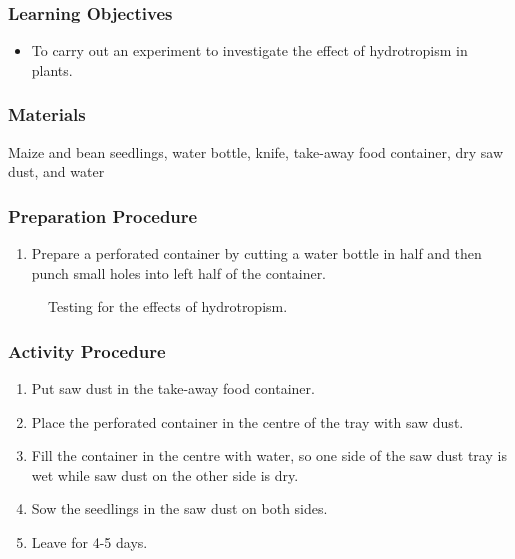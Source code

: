 \subsubsection*{Learning Objectives}
\begin{itemize}
\item{To carry out an experiment to investigate the effect of hydrotropism in plants.}
\end{itemize}

\subsubsection*{Materials}
Maize and bean seedlings, water bottle, knife, take-away food container, dry saw dust, and water

\subsubsection*{Preparation Procedure}
\begin{enumerate}
\item{Prepare a perforated container by cutting a water bottle in half and then punch small holes into left half of the container.}
\end{enumerate}

\begin{figure}[h]
\begin{center}
\def\svgwidth{12cm}

\caption{Testing for the effects of hydrotropism.}
\label{fig:hydro}
\end{center}
\end{figure}

\subsubsection*{Activity Procedure}
\begin{enumerate}
\item{Put saw dust in the take-away food container.}
\item{Place the perforated container in the centre of the tray with saw dust.}
\item{Fill the container in the centre with water, so one side of the saw dust tray is wet while saw dust on the other side is dry.}
\item{Sow the seedlings in the saw dust on both sides.}
\item{Leave for 4-5 days.}
\end{enumerate}

